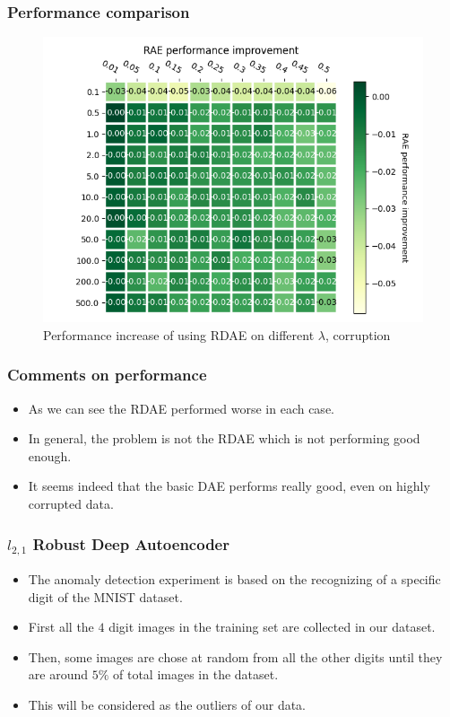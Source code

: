 \documentclass{beamer}
\theoremstyle{plain}
\theoremstyle{definition}
\theoremstyle{remark}
\begin{document}
\begin{frame}
	\frametitle{Performance comparison}
	\begin{figure}
		\centering
		\includegraphics[width=0.7\linewidth]{Images/performance.png}
		\caption[]{Performance increase of using RDAE on different $\lambda$, corruption}
	\end{figure}
\end{frame}

\begin{frame}
	\frametitle{Comments on performance}
	\begin{itemize}
		\item As we can see the RDAE performed worse in each case.
		\item In general, the problem is not the RDAE which is not performing good enough.
		\item It seems indeed that the basic DAE performs really good, even on highly corrupted data.
	\end{itemize}
\end{frame}


\begin{frame}
	\frametitle{$l_{2,1}$ Robust Deep Autoencoder}
	\begin{itemize}
		\item The anomaly detection experiment is based on the recognizing of a specific digit of the MNIST dataset.
		\item First all the $4$ digit images in the training set are collected in our dataset.
		\item Then, some images are chose at random from all the other digits until they are around $5\%$ of total images in the dataset.
		\item This will be considered as the outliers of our data.
	\end{itemize}
\end{frame}
\end{document}
